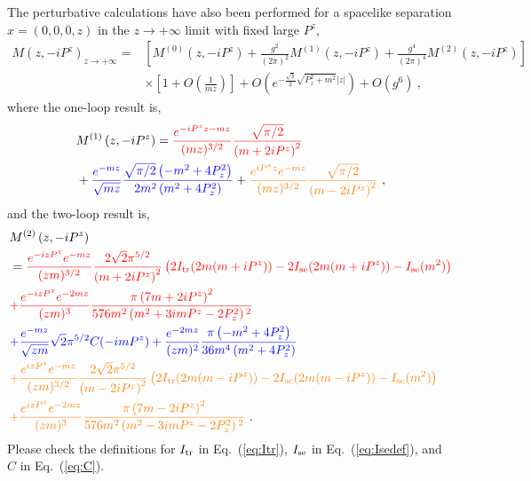\documentclass[a4paper,11pt]{article}
\begin{document}
The perturbative calculations have also been performed for a spacelike separation $x=(0,0,0,z)$ in the $z\rightarrow +\infty$ limit with fixed large $P^z$,
\begin{align}\label{eq:MLzphi3}
M\left(z, -i P^z\right)_{z\rightarrow+\infty} 
= & \left[ M^{(0)}\left(z, -i P^z\right) 
+ \frac{g^2}{(2\pi)^2} M^{(1)}\left(z, -i P^z\right) 
+ \frac{g^4}{(2\pi)^4}  M^{(2)}\left(z, -i P^z\right) \right] \nonumber\\
&\times \left[1+O\left(\frac{1}{m z}\right)\right] 
+ O\left(e^{-\frac{\sqrt{3}}{2} \sqrt{P_z^2+m^2} |z| }\right) +  O\left(g^6\right) \ ,
\end{align}
where the one-loop result is,
\begin{align}\label{eq:MLz(1)phi3}
&M^{(1)}\left(z, -i P^z\right) =  {\color{red} \frac{e^{- i P^z z - m z}}{ (m z)^{3/2}} \frac{\sqrt{\pi/2}}{\left(m+2 i P^z\right)^2} } \nonumber\\  
&+ {\color{blue} \frac{e^{-m z}}{\sqrt{m z}} \frac{\sqrt{\pi/2} \left(-m^2+4 P_z^2\right)}{2 m^{2}\left(m^2+4 P_z^2\right)}} 
+  {\color{orange} \frac{e^{i P^z z} e^{-m z}}{(m z)^{3/2}} \frac{\sqrt{\pi/2}}{ \left(m-2 i P^z\right)^2} }  \ ,
\end{align}
and the two-loop result is,
\begin{align}\label{eq:MLz(2)phi3}
&M^{(2)}\left(z, -i P^z\right) \nonumber\\
&=  {\color{red} \frac{e^{-i z P^z} e^{-m z}}{(z m)^{3/2}} \frac{2 \sqrt{2} \pi ^{5/2}}{\left(m+2 i P^z\right)^2} \left( 2 I_{\rm tr}(2m(m+iP^z))-2I_{\rm se}(2m(m+iP^z)) - I_{\rm se}(m^2)  \right)  }
\nonumber\\
&{\color{red} + \frac{e^{-i z P^z} e^{-2 m z}}{(z m)^3} \frac{\pi  \left(7 m+2 i P^z\right)^2}{576 m^2 \left(m^2+3 i m P^z-2P_z^2\right){}^2} } \nonumber\\
&{\color{blue} + \frac{e^{-m z}}{\sqrt{z m}} \sqrt{2} \pi^{5/2} C(-i m P^z) 
 + \frac{e^{-2 m z}}{(z m)^2} \frac{\pi  \left(-m^2+4 P_z^2\right)}{36 m^4 \left(m^2+4 P_z^2\right)} } \nonumber\\
&{\color{orange}+\frac{e^{i z P^z} e^{-m z}}{(z m)^{3/2}} \frac{2 \sqrt{2} \pi ^{5/2}}{ \left(m-2i P^z\right)^2} \left( 2 I_{\rm tr}(2m(m-iP^z))-2I_{\rm se}(2m(m-iP^z)) - I_{\rm se}(m^2)  \right) }\nonumber\\
&{\color{orange} +\frac{e^{i z P^z} e^{-2 m z}}{(zm)^3} \frac{\pi  \left(7 m-2 i P^z\right)^2}{576 m^2 \left(m^2-3 i m P^z-2P_z^2\right){}^2}  } \ .
\end{align}
Please check the definitions for $I_{\rm tr}$ in Eq.~(\ref{eq:Itr}), $I_{\rm se}$ in Eq.~(\ref{eq:Isedef}), and $C$ in Eq.~(\ref{eq:C}).
\end{document}
